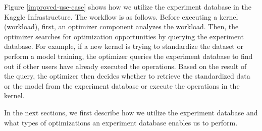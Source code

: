 Figure \ref{improved-use-case} shows how we utilize the experiment database in the Kaggle Infrastructure. 
The workflow is as follows.
Before executing a kernel (workload), first, an optimizer component analyzes the workload.
Then, the optimizer searches for optimization opportunities by querying the experiment database.
For example, if a new kernel is trying to standardize the dataset or perform a model training, 
the optimizer queries the experiment database to find out if other users have already executed the operations.
Based on the result of the query, the optimizer then decides whether to retrieve the standardized data or the model from the experiment database or execute the operations in the kernel.

In the next sections, we first describe how we utilize the experiment database and what types of optimizations an experiment database enables us to perform.
